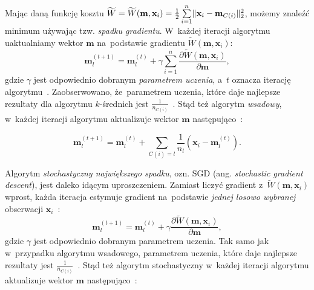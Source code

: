 \documentclass{praca1}
\DeclarePairedDelimiter{\norm}{\lVert}{\rVert}
\begin{document}
Mając daną funkcję kosztu $\widetilde{W} = \widetilde{W}(\mathbf{m}, \mathbf{x}_i) = \frac{1}{2}\sum\limits_{i=1}^{n} \norm{\mathbf{x}_i - \mathbf{m}_{C(i)}}_2^2 $, możemy znaleźć minimum używając tzw. \emph{spadku gradientu}. W~każdej iteracji algorytmu uaktualniamy wektor $\mathbf{m}$ na~podstawie gradientu $\widetilde{W}(\mathbf{m}, \mathbf{x}_i)$:
\begin{equation}
\mathbf{m}^{(t+1)}_l = \mathbf{m}_l^{(t)} + \gamma \sum\limits_{i=1}^{n} \frac{\partial \widetilde{W}(\mathbf{m}, \mathbf{x}_i)}{\partial \mathbf{m}},
\end{equation}
gdzie $\gamma$ jest odpowiednio dobranym \emph{parametrem uczenia}, a~$t$ oznacza iterację algorytmu~\cite{Bottou2012:sgdtricks}. Zaobserwowano, że~parametrem uczenia, które daje najlepsze rezultaty dla algorytmu $k$-średnich jest $\frac{1}{n_{C(i)}}$~\cite{Bottou1995:convergenceproperties}. Stąd też algorytm \emph{wsadowy}, w~każdej iteracji algorytmu aktualizuje wektor $\mathbf{m}$ następująco~\cite{Bottou1995:convergenceproperties}:



\begin{equation}
\mathbf{m}_l^{(t+1)} = \mathbf{m}_l^{(t)} + \sum\limits_{C(i) = l}   \frac{1}{n_l}(\mathbf{x}_i - \mathbf{m}^{(t)}_l).
\end{equation}

Algorytm \emph{stochastyczny największego spadku}, ozn. SGD (ang. \emph{stochastic gradient descent}), jest daleko idącym uproszczeniem. Zamiast liczyć gradient z~$\widetilde{W}(\mathbf{m}, \mathbf{x}_i)$ wprost, każda iteracja estymuje gradient na~podstawie \emph{jednej losowo wybranej} obserwacji $\mathbf{x}_i$~\cite{Bottou2012:sgdtricks}:
\begin{equation}
\mathbf{m}_l^{(t+1)} = \mathbf{m}_l^{(t)} + \gamma \frac{\partial \widetilde{W}(\mathbf{m}, \mathbf{x}_i)}{\partial \mathbf{m}},
\end{equation}
gdzie $\gamma$ jest odpowiednio dobranym parametrem uczenia. Tak samo jak w~przypadku algorytmu wsadowego, parametrem uczenia, które daje najlepsze rezultaty jest $\frac{1}{n_{C(i)}}$~\cite{Bottou1995:convergenceproperties}. Stąd też algorytm stochastyczny w~każdej iteracji algorytmu aktualizuje wektor $\mathbf{m}$ następująco~\cite{Bottou1995:convergenceproperties}:
\end{document}
